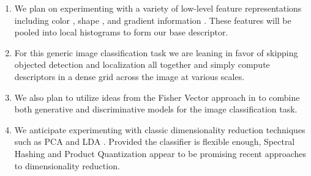 \documentclass[12pt]{article}
\begin{document}
\begin{enumerate}

\item We plan on experimenting with a variety of low-level feature representations including color \cite{sande10}, shape \cite{ahonen06}, and gradient information \cite{lowe04,dalal05}. These features will be pooled into local histograms to form our base descriptor.

\item For this generic image classification task we are leaning in favor of skipping objected detection and localization all together and simply compute descriptors in a dense grid across the image at various scales.

\item  We also plan to utilize ideas from the Fisher Vector approach in \cite{csurka2011fisher} to combine both generative and discriminative models for the image classification task.

\item We anticipate experimenting with classic dimensionality reduction techniques such as PCA \cite{turk91} and LDA \cite{belhumeur97}. Provided the classifier is flexible enough, Spectral Hashing \cite{weiss2008} and Product Quantization \cite{jegou2011} appear to be promising recent approaches to dimensionality reduction.

\end{enumerate}



\end{document}
